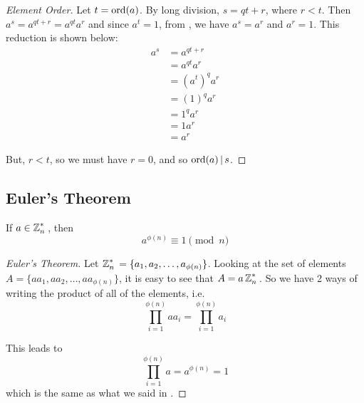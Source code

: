 \begin{proof}[Element Order]\label{proof:Element_Order}
  Let $t = \operatorname{\operatorname{ord}}(a)$.
  By long division, $s = qt + r$, where $r < t$.
  Then $a^{s} = a^{qt + r} = a^{qt}a^{r}$ and since $a^{t} = 1$, from , we have $a^{s} = a^{r}$ and $a^{r} = 1$.
  This reduction is shown below:
  \begin{align*}
    a^{s} &= a^{qt + r} \\
          &= a^{qt}a^{r} \\
          &= {\left( a^{t} \right)}^{q} a^{r} \\
          &= {\left( 1 \right)}^{q} a^{r} \\
          &= 1^{q} a^{r} \\
          &= 1 a^{r} \\
          &= a^{r}
  \end{align*}

  But, $r<t$, so we must have $r=0$, and so $\operatorname{\operatorname{ord}}(a) \operatorname{\vert} s$.
\end{proof}

\subsection{Euler's Theorem}\label{subsec:Eulers_Theorem}
\begin{theorem}\label{thm:Eulers_Theorem}
  If $a \in \operatorname{\mathbb{Z}}_{n}^{*}{}$, then
  \begin{equation}\label{eq:Eulers_Theorem}
    a^{\phi(n)} \equiv 1 \pmod{n}
  \end{equation}
\end{theorem}

\begin{proof}[Euler's Theorem]\label{proof:Eulers_Theorem}
  Let $\operatorname{\mathbb{Z}}_{n}^{*}{} = \lbrace a_{1}, a_{2}, \ldots, a_{\phi(n)} \rbrace$.
  Looking at the set of elements $A = \lbrace aa_{1}, aa_{2}, \ldots, aa_{\phi(n)} \rbrace$, it is easy to see that $A = a \operatorname{\mathbb{Z}}_{n}^{*}{}$.
  So we have 2 ways of writing the product of all of the elements, i.e.
  \begin{equation*}
    \prod\limits_{i=1}^{\phi(n)} a a_{i} = \prod\limits_{i=1}^{\phi(n)} a_{i}
  \end{equation*}
  
  This leads to
  \begin{equation*}
    \prod\limits_{i=1}^{\phi(n)} a = a^{\phi(n)} = 1
  \end{equation*}
  which is the same as what we said in .
\end{proof}

